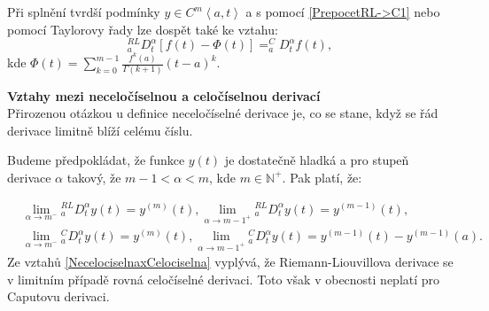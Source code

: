 \documentclass[a4paper,12pt,twoside]{article}
\theoremstyle{definition}
\theoremstyle{remark}
\numberwithin{equation}{section}
\numberwithin{table}{section}
\numberwithin{figure}{section}
\newcommand{\N}{\mathbb{N}}
\begin{document}
Při splnění tvrdší podmínky $y \in C^{m} \left\langle a, t\right\rangle $ a s pomocí \eqref{PrepocetRL->C1} nebo pomocí Taylorovy řady lze dospět také ke vztahu:
\begin{equation}
	_{a}^{RL}D^{\alpha}_{t} \left[f\left(t\right) - \Phi \left(t\right) \right] = _{a}^{C}D^{\alpha}_{t} f\left(t\right),
\end{equation} 
kde $\Phi \left(t\right) = \sum_{k=0}^{m-1} \frac{f^{k}\left(a\right)}{\Gamma \left(k+1\right)} \left(t-a\right)^{k}$.


\textbf{Vztahy mezi neceločíselnou a celočíselnou derivací}\\
Přirozenou otázkou u definice neceločíselné derivace je, co se stane, když se řád derivace limitně blíží celému číslu.

Budeme předpokládat, že funkce $y\left(t\right)$ je dostatečně hladká a pro stupeň derivace $\alpha$ takový, že $m-1<\alpha<m$, kde $m \in \N^{+}$. Pak platí, že:

\begin{equation} \label{NecelociselnaxCelociselna}
	\begin{aligned}
		&\lim\limits_{\alpha \to m^{-}} {_{a}^{RL}D^{\alpha}_{t}} y\left(t\right) = y^{\left(m\right)} \left(t\right),
		\lim\limits_{\alpha \to {m-1}^{+}} {_{a}^{RL}D^{\alpha}_{t}} y\left(t\right) = y^{\left(m-1\right)} \left(t\right), \\
		&\lim\limits_{\alpha \to m^{-}} {_{a}^{C}D^{\alpha}_{t}} y\left(t\right) = y^{\left(m\right)} \left(t\right),
		\lim\limits_{\alpha \to {m-1}^{+}} {_{a}^{C}D^{\alpha}_{t}} y\left(t\right) = y^{\left(m-1\right)} \left(t\right)- y^{\left(m-1\right)} \left(a\right).
	\end{aligned}
\end{equation} 
\cite{Cangpin}
Ze vztahů \ref{NecelociselnaxCelociselna} vyplývá, že Riemann-Liouvillova derivace se v limitním případě rovná celočíselné derivaci. Toto však v obecnosti neplatí pro Caputovu derivaci.
\end{document}
